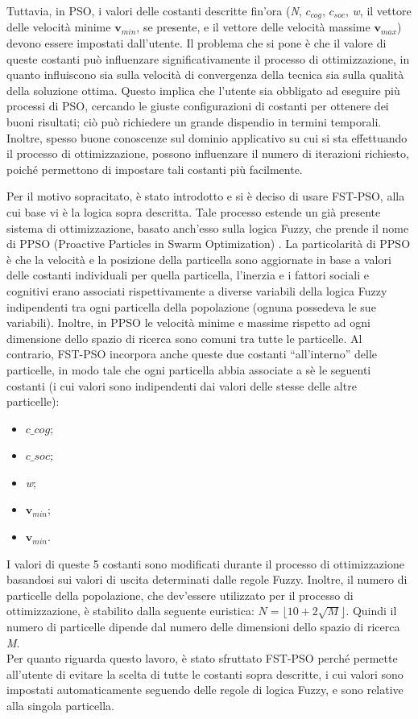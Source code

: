 Tuttavia, in PSO, i valori delle costanti descritte fin'ora (\textit{N}, $c_{cog}$, $c_{soc}$, \textit{w}, il vettore delle velocità minime $\textbf{v}_{min}$, se presente, e il vettore delle velocità massime $\textbf{v}_{max}$) devono essere impostati dall'utente. 
Il problema che si pone è che il valore di queste costanti può influenzare significativamente il processo di ottimizzazione, in quanto influiscono sia sulla velocità di convergenza della tecnica sia sulla qualità della soluzione ottima. 
Questo implica che l'utente sia obbligato ad eseguire più processi di PSO, cercando le giuste configurazioni di costanti per ottenere dei buoni risultati; ciò può richiedere un grande dispendio in termini temporali. 
Inoltre, spesso buone conoscenze sul dominio applicativo su cui si sta effettuando il processo di ottimizzazione, possono influenzare il numero di iterazioni richiesto, poiché permettono di impostare tali costanti più facilmente.

Per il motivo sopracitato, è stato introdotto e si è deciso di usare FST-PSO, alla cui base vi è la logica sopra descritta. 
Tale processo estende un già presente sistema di ottimizzazione, basato anch'esso sulla logica Fuzzy, che prende il nome di PPSO (Proactive Particles in Swarm Optimization) \cite{nobile2015}. 
La particolarità di PPSO è che la velocità e la posizione della particella sono aggiornate in base a valori delle costanti individuali per quella particella, l'inerzia e i fattori sociali e cognitivi erano associati rispettivamente a diverse variabili della logica Fuzzy indipendenti tra ogni particella della popolazione (ognuna possedeva le sue variabili). 
Inoltre, in PPSO le velocità minime e massime rispetto ad ogni dimensione dello spazio di ricerca sono comuni tra tutte le particelle. 
Al contrario, FST-PSO incorpora anche queste due costanti “all'interno” delle particelle, in modo tale che ogni particella abbia associate a sè le seguenti costanti (i cui valori sono indipendenti dai valori delle stesse delle altre particelle): \begin{itemize}
	\item $c\_{cog}$;
	\item $c\_{soc}$;
	\item \textit{w};
	\item $\textbf{v}_{min}$;
	\item $\textbf{v}_{min}$.
\end{itemize}
I valori di queste 5 costanti sono modificati durante il processo di ottimizzazione basandosi sui valori di uscita determinati dalle regole Fuzzy. 
Inoltre, il numero di particelle della popolazione, che dev'essere utilizzato per il processo di ottimizzazione, è stabilito dalla seguente euristica: $\textit{N} = \lfloor10 + 2\sqrt{\textit{M}}\rfloor$.
Quindi il numero di particelle dipende dal numero delle dimensioni dello spazio di ricerca \textit{M}.\\
Per quanto riguarda questo lavoro, è stato sfruttato FST-PSO perché permette all'utente di evitare la scelta di tutte le costanti sopra descritte, i cui valori sono impostati automaticamente seguendo delle regole di logica Fuzzy, e sono relative alla singola particella.

